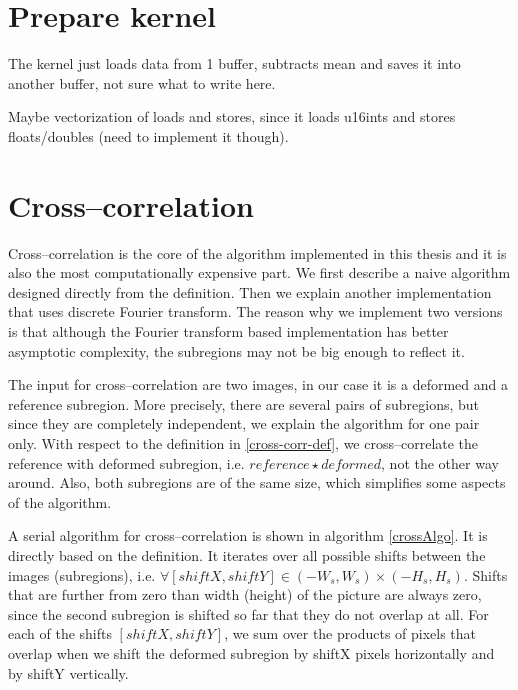 \section{Prepare kernel}
The kernel just loads data from 1 buffer, subtracts mean and saves it into another buffer, not sure what to write here.

Maybe vectorization of loads and stores, since it loads u16ints and stores floats/doubles (need to implement it though).

\section{Cross--correlation}
Cross--correlation is the core of the algorithm implemented in this thesis and it is also the most computationally expensive part. We first describe a naive algorithm designed directly from the definition. Then we explain another implementation that uses discrete Fourier transform. The reason why we implement two versions is that although the Fourier transform based implementation has better asymptotic complexity, the subregions may not be big enough to reflect it.

The input for cross--correlation are two images, in our case it is a deformed and a reference subregion. More precisely, there are several pairs of subregions, but since they are completely independent, we explain the algorithm for one pair only. With respect to the definition in \cref{cross-corr-def}, we cross--correlate the reference with deformed subregion, i.e. $reference \star deformed$, not the other way around. Also, both subregions are of the same size, which simplifies some aspects of the algorithm.

A serial algorithm for cross--correlation is shown in algorithm \ref{crossAlgo}. It is directly based on the definition. It iterates over all possible shifts between the images (subregions), i.e. $\forall [shiftX, shiftY] \in (-W_s, W_s) \times (-H_s, H_s)$. Shifts that are further from zero than width (height) of the picture are always zero, since the second subregion is shifted so far that they do not overlap at all. For each of the shifts $[shiftX, shiftY]$, we sum over the products of pixels that overlap when we shift the deformed subregion by shiftX pixels horizontally and by shiftY vertically.



